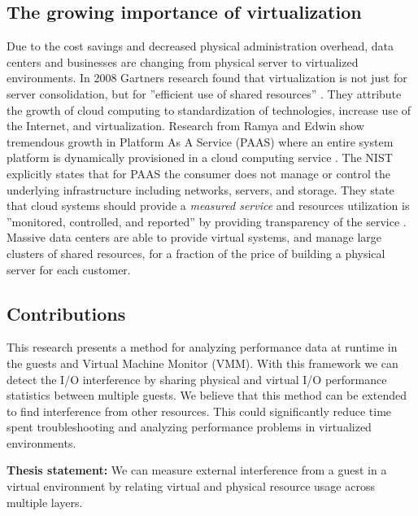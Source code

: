 \subsection{The growing importance of virtualization}
Due to the cost savings and decreased physical administration overhead, data centers and businesses are changing from physical server to virtualized environments. In 2008 Gartners research found that virtualization is not just for server consolidation, but for ”efficient use of shared resources” \cite{gartners}.  They attribute the growth of cloud computing to standardization of technologies, increase use of the Internet, and virtualization.  Research from Ramya and Edwin show tremendous growth in Platform As A Service (PAAS) where an entire system platform is dynamically provisioned in a cloud computing service \cite{ramya}. The NIST explicitly states that for PAAS the consumer does not manage or control the underlying infrastructure including networks, servers, and storage. They state that cloud systems should provide a \emph{measured service} and resources utilization is ”monitored, controlled, and reported” by providing transparency of the service \cite{nist}.  Massive data centers are able to provide virtual systems, and manage large clusters of shared resources, for a fraction of the price of building a physical server for each customer.

\subsection{Contributions}
This research presents a method for analyzing performance data at runtime in the guests and Virtual Machine Monitor (VMM).   With this framework we can detect the I/O interference by sharing physical and virtual I/O performance statistics between multiple guests.  We believe that this method can be extended to find interference from other resources.  This could significantly reduce time spent troubleshooting and analyzing performance problems in virtualized environments.
\newline

\textbf{Thesis statement:}  We can measure external interference from a guest in a virtual environment by relating virtual and physical resource usage across multiple layers.
\newline


